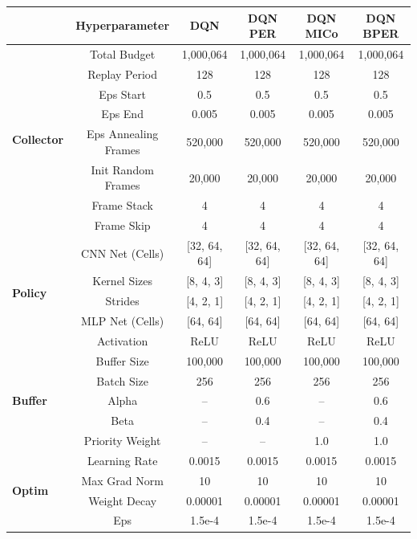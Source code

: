 \begin{table}[H]
\centering

\hspace*{-1cm}
\begin{tabular}{@{} lccccc @{}}
\toprule
& \textbf{Hyperparameter} & {\footnotesize\textbf{DQN}} & {\footnotesize \textbf{DQN PER}} & {\footnotesize\textbf{DQN MICo}} & {\footnotesize\textbf{DQN BPER}} \\ 
\midrule

\multirow{8}{*}{\textbf{Collector}} 
& Total Budget & 1,000,064 & 1,000,064 & 1,000,064 & 1,000,064 \\ 
& Replay Period & 128 & 128 & 128 & 128 \\ 
& Eps Start & 0.5 & 0.5 & 0.5 & 0.5 \\ 
& Eps End & 0.005 & 0.005 & 0.005 & 0.005 \\ 
& Eps Annealing Frames & 520,000 & 520,000 & 520,000 & 520,000 \\ 
& Init Random Frames & 20,000 & 20,000 & 20,000 & 20,000 \\ 
& Frame Stack & 4 & 4 & 4 & 4 \\
& Frame Skip & 4 & 4 & 4 & 4 \\ 
\midrule

\multirow{5}{*}{\textbf{Policy}} 
& CNN Net (Cells) & [32, 64, 64] & [32, 64, 64] & [32, 64, 64] & [32, 64, 64] \\ 
& Kernel Sizes & [8, 4, 3] & [8, 4, 3] & [8, 4, 3] & [8, 4, 3] \\ 
& Strides & [4, 2, 1] & [4, 2, 1] & [4, 2, 1] & [4, 2, 1] \\ 
& MLP Net (Cells) & [64, 64] & [64, 64] & [64, 64] & [64, 64] \\ 
& Activation & ReLU & ReLU & ReLU & ReLU \\ 
\midrule

\multirow{5}{*}{\textbf{Buffer}} 
& Buffer Size & 100,000 & 100,000 & 100,000 & 100,000 \\ 
& Batch Size & 256 & 256 & 256 & 256 \\ 
& Alpha & -- & 0.6 & -- & 0.6 \\ 
& Beta & -- & 0.4 & -- & 0.4 \\ 
& Priority Weight & -- & -- & 1.0 & 1.0 \\ 
\midrule

\multirow{4}{*}{\textbf{Optim}} 
& Learning Rate & 0.0015 & 0.0015 & 0.0015 & 0.0015 \\ 
& Max Grad Norm & 10 & 10 & 10 & 10 \\ 
& Weight Decay & 0.00001 & 0.00001 & 0.00001 & 0.00001 \\ 
& Eps & 1.5e-4 & 1.5e-4 & 1.5e-4 & 1.5e-4 \\ 
\midrule


\end{tabular}
\end{table}
